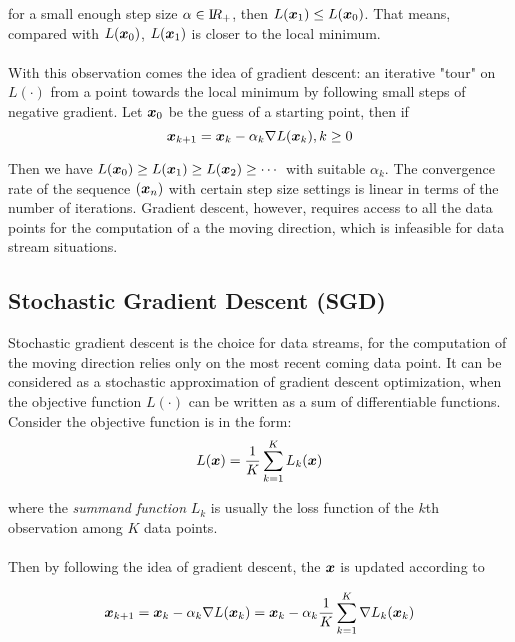         for a small enough step size $\alpha \in \mathrm I\!R_{+}$, then $L(\bm{x}_1) \leq L(\bm{x}_0)$. 
        That means, compared with $L(\bm{x}_0)$, $L(\bm{x}_1)$ is closer to the local minimum.
        \\\\
        With this observation comes the idea of gradient descent: an iterative "tour" on $L(\cdot)$ from a point towards the 
        local minimum by following small steps of negative gradient. 
        Let $\bm{x}_0$ be the guess of a starting point, then if
        \begin{equation}
            \bm{x}_{k+1} = \bm{x}_{k} - \alpha_k \nabla L(\bm{x}_k), k \geq 0
        \end{equation}
        
        
        Then we have $ L(\bm{x}_0) \geq L(\bm{x}_1) \geq L(\bm{x}_2) \geq \cdots$ with suitable $\alpha_k$. The convergence rate of the 
        sequence $(\bm{x}_n)$ with certain step size settings is linear in terms of the number of iterations.
        Gradient descent, however, requires access to all the data points for the computation of a the moving direction, which is infeasible for data stream situations.


    \subsection{Stochastic Gradient Descent (SGD)}
        Stochastic gradient descent is the choice for data streams, for the computation of the moving direction relies only on the most recent coming data point.
        It can be considered as a stochastic approximation of gradient descent optimization, 
        when the objective function $L(\cdot)$ can be written as a sum of differentiable functions.
        Consider the objective function is in the form:
        \begin{equation}
            L(\bm{x}) =\frac{1}{K} \sum_{k=1}^{K} L_k (\bm{x})
        \end{equation}

        where the \textit{summand function} $L_k$ is usually the loss function of the $k$th observation among
        $K$ data points.
        \\\\
        Then by following the idea of gradient descent, the $\bm{x}$ is updated according to
        
        \begin{equation}
           \bm{x}_{k+1} = \bm{x}_{k} -\alpha_k \nabla L(\bm{x}_k) = \bm{x}_{k} -\alpha_k \frac{1}{K}\sum_{k=1}^{K} \nabla L_k(\bm{x}_k) 
        \end{equation}
        
